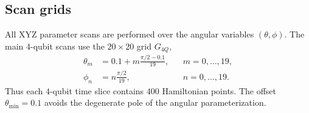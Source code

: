\documentclass[aps,physrev,preprint,groupedaddress]{revtex4-2}
\begin{document}

\subsection{Scan grids}\label{sm:numerics-scan-grids}
All XYZ parameter scans are performed over the angular variables $(\theta,\phi)$. The main 4-qubit scans use the $20\times20$ grid $G_{4Q}$,
\begin{equation}
\begin{aligned}
    \theta_m &= 0.1+m\frac{\pi/2-0.1}{19}, &&m=0,\ldots,19,\\
    \phi_n &= n\frac{\pi/2}{19}, &&n=0,\ldots,19 .
\end{aligned}
\end{equation}
Thus each $4$-qubit time slice contains $400$ Hamiltonian points. The offset $\theta_{\min}=0.1$ avoids the degenerate pole of the angular parameterization.
\end{document}
